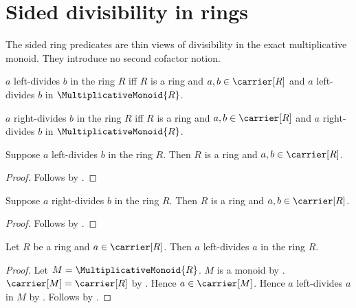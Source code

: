 





\section{Sided divisibility in rings}

The sided ring predicates are thin views of divisibility in the exact
multiplicative monoid.  They introduce no second cofactor notion.

\begin{definition}\label{left_ring_divisibility}
    $a$ left-divides $b$ in the ring $R$ iff
        $R$ is a ring and $a,b\in\carrier[R]$ and
        $a$ left-divides $b$ in $\MultiplicativeMonoid{R}$.
\end{definition}

\begin{definition}\label{right_ring_divisibility}
    $a$ right-divides $b$ in the ring $R$ iff
        $R$ is a ring and $a,b\in\carrier[R]$ and
        $a$ right-divides $b$ in $\MultiplicativeMonoid{R}$.
\end{definition}

\begin{proposition}\label{left_ring_divisibility_guards}
    Suppose $a$ left-divides $b$ in the ring $R$.
    Then $R$ is a ring and $a,b\in\carrier[R]$.
\end{proposition}
\begin{proof}
    Follows by .
\end{proof}

\begin{proposition}\label{right_ring_divisibility_guards}
    Suppose $a$ right-divides $b$ in the ring $R$.
    Then $R$ is a ring and $a,b\in\carrier[R]$.
\end{proposition}
\begin{proof}
    Follows by .
\end{proof}

\begin{proposition}\label{left_ring_divisibility_reflexive}
    Let $R$ be a ring and $a\in\carrier[R]$.
    Then $a$ left-divides $a$ in the ring $R$.
\end{proposition}
\begin{proof}
    Let $M=\MultiplicativeMonoid{R}$.
    $M$ is a monoid by .
    $\carrier[M]=\carrier[R]$ by
        .
    Hence $a\in\carrier[M]$.
    Hence $a$ left-divides $a$ in $M$ by
        .
    Follows by .
\end{proof}

